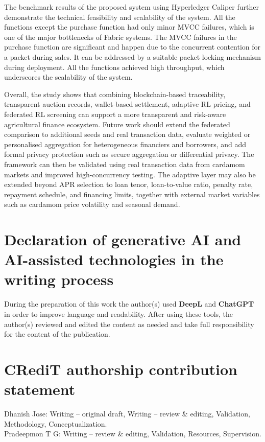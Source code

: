 \documentclass[12pt]{article}
\begin{document}
The benchmark results of the proposed system using Hyperledger Caliper further demonstrate the technical feasibility and scalability of the system. All the functions except the purchase function had only minor MVCC failures, which is one of the major bottlenecks of Fabric systems. The MVCC failures in the purchase function are significant and happen due to the concurrent contention for a packet during sales. It can be addressed by a suitable packet locking mechanism during deployment. All the functions achieved high throughput, which underscores the scalability of the system.

Overall, the study shows that combining blockchain-based traceability, transparent auction records, wallet-based settlement, adaptive RL pricing, and federated RL screening can support a more transparent and risk-aware agricultural finance ecosystem. Future work should extend the federated comparison to additional seeds and real transaction data, evaluate weighted or personalised aggregation for heterogeneous financiers and borrowers, and add formal privacy protection such as secure aggregation or differential privacy. The framework can then be validated using real transaction data from cardamom markets and improved high-concurrency testing. The adaptive layer may also be extended beyond APR selection to loan tenor, loan-to-value ratio, penalty rate, repayment schedule, and financing limits, together with external market variables such as cardamom price volatility and seasonal demand.

	\section*{Declaration of generative AI and AI-assisted technologies in the writing process}
	During the preparation of this work the author(s) used \textbf{DeepL} and \textbf{ChatGPT} in order to improve language and readability. 
	After using these tools, the author(s) reviewed and edited the content as needed and take full responsibility for the content of the publication.
	
	\section*{CRediT authorship contribution statement}
	Dhanish Jose: Writing – original draft, Writing – review \& editing, Validation, Methodology, Conceptualization.\\
	Pradeepmon T G: Writing – review \& editing, Validation, Resources, Supervision.
	
\end{document}
